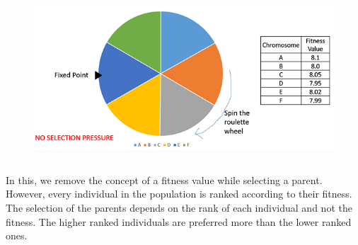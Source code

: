 \documentclass[12pt]{article}
\renewcommand{\_}{\kern-1.5pt\textunderscore\kern-1.5pt}
\begin{document}
\begin{enumerate}

\begin{figure}[H]
	\begin{Center}
		\includegraphics[width=6.24in,height=2.44in]{./media/image11.png}
	\end{Center}
\end{figure}



\setlength{\parskip}{8.04pt}
\par

\setlength{\parskip}{7.2pt}
\begin{adjustwidth}{0.03in}{0.03in}
{\fontsize{11pt}{13.2pt}\selectfont In this, we remove the concept of a fitness value while selecting a parent. However, every individual in the population is ranked according to their fitness. The selection of the parents depends on the rank of each individual and not the fitness. The higher ranked individuals are preferred more than the lower ranked ones.\par}\par

\end{adjustwidth}






\end{enumerate}
\end{document}
